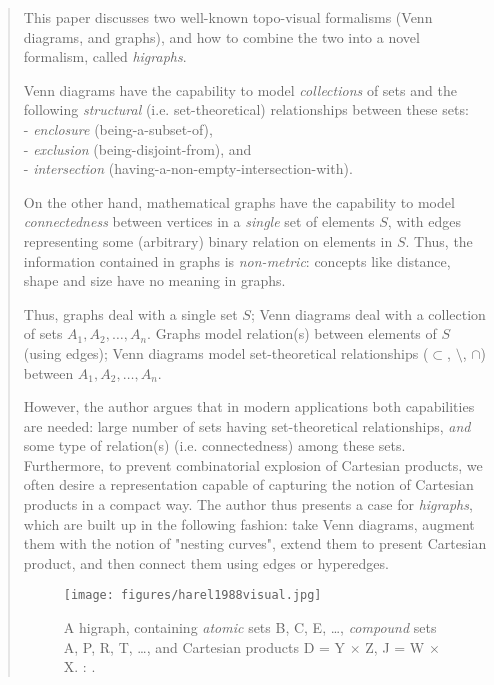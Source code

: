 		\begin{quote}
		\small
		This paper discusses two well-known topo-visual formalisms (Venn diagrams, and
		graphs), and how to combine the two into a novel formalism, called {\em higraphs}.
		
		Venn diagrams have the capability to model {\em collections} of sets and 
		the following {\em structural} (i.e. set-theoretical) relationships between these sets:\\
		- {\em enclosure} (being-a-subset-of),\\
		- {\em exclusion} (being-disjoint-from), and\\
		- {\em intersection} (having-a-non-empty-intersection-with).
		
		On the other hand, mathematical graphs have the capability to model {\em connectedness}
		between vertices in a {\em single} set of elements $S$, with edges representing some
		(arbitrary) binary relation on elements in $S$. Thus, the information contained in
		graphs is {\em non-metric}: concepts like distance, shape and size have no meaning
		in graphs.
		
		Thus, graphs deal with a single set $S$; Venn diagrams deal with a 
		collection of sets $A_1, A_2, \dots, A_n$.
		Graphs model relation(s) between elements of $S$ (using edges); Venn diagrams model set-theoretical 
		relationships ($\subset$, $\setminus$, $\cap$) between $A_1, A_2, \dots, A_n$.
		
		However, the author argues that in modern applications both capabilities are needed:
		large number of sets having set-theoretical relationships, {\em and} 
		some type of relation(s) (i.e. connectedness) among these sets. Furthermore,
		to prevent combinatorial explosion of Cartesian products, we often desire
		a representation capable of capturing the notion of Cartesian products in
		a compact way. The author thus presents a case for {\em higraphs}, which are
		built up in the following fashion: take Venn diagrams, augment them with the notion
		of "nesting curves", extend them to present Cartesian product, and 
		then connect them using edges or hyperedges.
		
		\begin{figure}[htb]
		\centering
		\texttt{[image: figures/harel1988visual.jpg]}
		\caption{
		A higraph, containing {\em atomic} sets B, C, E, \dots, {\em compound} sets
		A, P, R, T, \dots, and Cartesian products D = Y $\times$ Z, J = W $\times$ X.  
		\citeauthor{harel1988visual}: 
		\cite{harel1988visual}.}
		\label{fig:harel1988visual}
		\end{figure}
		
		\end{quote}

